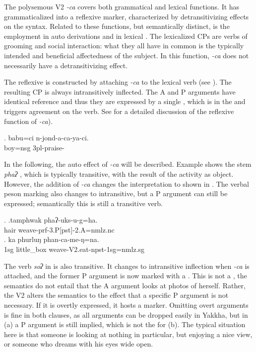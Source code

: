  The polysemous V2 \emph{-ca}  covers both grammatical and lexical functions. It has grammaticalized into a reflexive marker, characterized by detransitivizing effects on the syntax. Related to these functions, but semantically distinct, is the employment in auto derivations and in lexical . The lexicalized CPs are verbs of  grooming and social interaction: what  they all have in common is the typically intended and beneficial affectedness of the subject. In this function, \emph{-ca} does not necessarily have a detransitivizing effect.
 
 The reflexive is constructed by attaching  \emph{-ca}  to the lexical verb (see \Next). The resulting CP is always intransitively inflected. The A and P arguments have identical reference and thus they are expressed by a single , which is in the   and triggers agreement on the verb. See  for a detailed discussion of the reflexive function of \emph{-ca}). 
 
 \exg. babu=ci n-jond-a-ca-ya-ci.\\
boy{\sc =nsg} {\sc 3pl}-praise-\\

In the following, the auto effect of \emph{-ca} will be described. Example \Next[a] shows the stem \emph{phaʔ} , which is typically transitive, with  the result of the activity as object. However, the addition of  \emph{-ca} changes the interpretation to  shown in \Next[b]. The verbal peson marking also changes to intransitive, but a P argument can still be expressed; semantically this is still a transitive verb.  

\ex. \ag.tamphwak phaʔ-uks-u-g=ha.\\
		hair weave{\sc -prf-3.P[pst]-2.A=nmlz.nc} \\
\bg. ka phurluŋ phan-ca-me-ŋ=na.\\
		{\sc 1sg} little\_box weave{\sc -V2.eat-npst-1sg=nmlz.sg} \\

\newpage
The verb \emph{soʔ}  in \Next is also transitive. It changes to intransitive inflection when  \emph{-ca} is attached, and the former P argument is now marked with a  \Next[b]. This is not a , the semantics do not entail that the A argument looks at photos of herself. Rather, the V2 alters the semantics to the effect that a specific P argument is not necessary. If it is overtly expressed, it hosts a   marker. Omitting overt arguments is fine in both clauses, as all arguments can be dropped easily in Yakkha, but in (a) a P argument is still implied, which is not the  for (b). The typical situation here is that someone is looking at nothing in particular, but enjoying a nice view, or someone who dreams with his eyes wide open.

